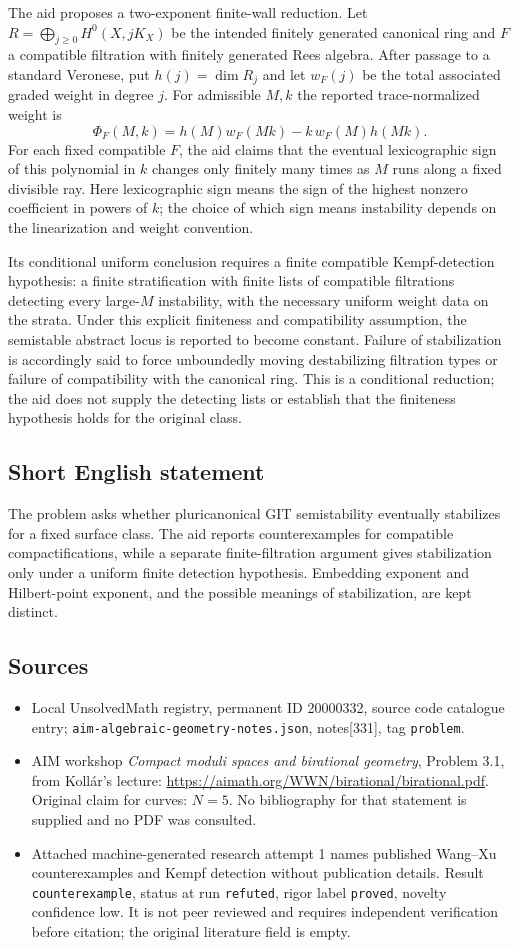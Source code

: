 \documentclass[11pt]{article}
\begin{document}
The aid proposes a two-exponent finite-wall reduction. Let $R=\bigoplus_{j\ge0}H^0(X,jK_X)$ be the intended finitely generated canonical ring and $F$ a compatible filtration with finitely generated Rees algebra. After passage to a standard Veronese, put $h(j)=\dim R_j$ and let $w_F(j)$ be the total associated graded weight in degree $j$. For admissible $M,k$ the reported trace-normalized weight is
\[\Phi_F(M,k)=h(M)w_F(Mk)-k\,w_F(M)h(Mk).\]
For each fixed compatible $F$, the aid claims that the eventual lexicographic sign of this polynomial in $k$ changes only finitely many times as $M$ runs along a fixed divisible ray. Here lexicographic sign means the sign of the highest nonzero coefficient in powers of $k$; the choice of which sign means instability depends on the linearization and weight convention.

Its conditional uniform conclusion requires a finite compatible Kempf-detection hypothesis: a finite stratification with finite lists of compatible filtrations detecting every large-$M$ instability, with the necessary uniform weight data on the strata. Under this explicit finiteness and compatibility assumption, the semistable abstract locus is reported to become constant. Failure of stabilization is accordingly said to force unboundedly moving destabilizing filtration types or failure of compatibility with the canonical ring. This is a conditional reduction; the aid does not supply the detecting lists or establish that the finiteness hypothesis holds for the original class.
\subsection{Short English statement}
The problem asks whether pluricanonical GIT semistability eventually stabilizes for a fixed surface class. The aid reports counterexamples for compatible compactifications, while a separate finite-filtration argument gives stabilization only under a uniform finite detection hypothesis. Embedding exponent and Hilbert-point exponent, and the possible meanings of stabilization, are kept distinct.
\subsection{Sources}
\begin{itemize}
\item Local UnsolvedMath registry, permanent ID 20000332, source code catalogue entry; \texttt{aim-algebraic-geometry-notes.json}, notes[331], tag \texttt{problem}.
\item AIM workshop \emph{Compact moduli spaces and birational geometry}, Problem 3.1, from Kollár's lecture: \url{https://aimath.org/WWN/birational/birational.pdf}. Original claim for curves: $N=5$. No bibliography for that statement is supplied and no PDF was consulted.
\item Attached machine-generated research attempt 1 names published Wang--Xu counterexamples and Kempf detection without publication details. Result \texttt{counterexample}, status at run \texttt{refuted}, rigor label \texttt{proved}, novelty confidence low. It is not peer reviewed and requires independent verification before citation; the original literature field is empty.
\end{itemize}
\end{document}
